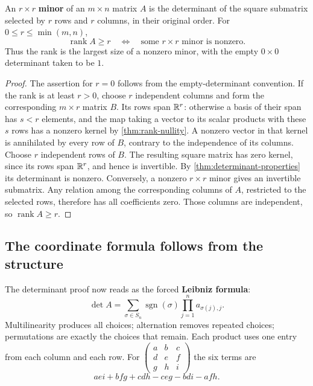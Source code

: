 \begin{proposition}\label{prop:rank-minors}
An $r\times r$ \textbf{minor} of an $m\times n$ matrix $A$ is the
determinant of the square submatrix selected by $r$ rows and $r$ columns,
in their original order. For $0\leq r\leq\min(m,n)$,
\[
\operatorname{rank}A\geq r
\quad\Longleftrightarrow\quad
\text{some $r\times r$ minor is nonzero}.
\]
Thus the rank is the largest size of a nonzero minor, with the empty
$0\times0$ determinant taken to be $1$.
\end{proposition}
\begin{proof}
The assertion for $r=0$ follows from the empty-determinant convention.
If the rank is at least $r>0$, choose $r$ independent columns and form
the corresponding $m\times r$ matrix $B$. Its rows span $\mathbb{R}^r$:
otherwise a basis of their span has $s<r$ elements, and the map taking
a vector to its scalar products with these $s$ rows has a nonzero kernel
by \cref{thm:rank-nullity}. A nonzero vector in that kernel is annihilated
by every row of $B$, contrary to the independence of its columns.
Choose $r$ independent rows of $B$. The resulting square matrix has
zero kernel, since its rows span $\mathbb{R}^r$, and hence is invertible.
By \cref{thm:determinant-properties} its determinant is nonzero.
Conversely, a nonzero $r\times r$ minor gives an invertible submatrix.
Any relation among the corresponding columns of $A$, restricted to the
selected rows, therefore has all coefficients zero. Those columns are
independent, so $\operatorname{rank}A\geq r$.
\end{proof}

\subsection*{The coordinate formula follows from the structure}
The determinant proof now reads as the forced \textbf{Leibniz formula}:
\[
\det A=\sum_{\sigma\in S_n}\operatorname{sgn}(\sigma)
\prod_{j=1}^n a_{\sigma(j),j}.
\]
Multilinearity produces all choices; alternation removes repeated choices;
permutations are exactly the choices that remain. Each product uses one
entry from each column and each row. For
$\left(\begin{matrix}a&b&c\\d&e&f\\g&h&i\end{matrix}\right)$
the six terms are
\[
aei+bfg+cdh-ceg-bdi-afh.
\]

